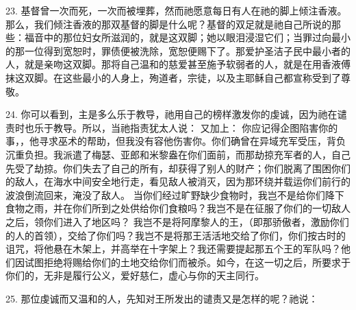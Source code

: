 23. 基督曾一次而死，一次而被埋葬，然而祂愿意每日有人在祂的脚上倾注香液。那么，我们倾注香液的那双基督的脚是什么呢？基督的双足就是祂自己所说的那些：福音中的那位妇女所滋润的，就是这双脚；她以眼泪浸湿它们；当罪过向最小的那一位得到宽恕时，罪债便被洗除，宽恕便赐下了。那爱护圣洁子民中最小者的人，就是亲吻这双脚。那将自己温和的慈爱甚至施予软弱者的人，就是在用香液傅抹这双脚。在这些最小的人身上，殉道者，宗徒，以及主耶稣自己都宣称受到了尊敬。\par

24. 你可以看到，主是多么乐于教导，祂用自己的榜样激发你的虔诚，因为祂在谴责时也乐于教导。所以，当祂指责犹太人说： 又加上： 你应记得企图陷害你的事，，他寻求巫术的帮助，但我没有容他伤害你。你们确曾在异域充军受压，背负沉重负担。我派遣了梅瑟、亚郎和米黎盎在你们面前，而那劫掠充军者的人，自己先受了劫掠。你们失去了自己的所有，却获得了别人的财产；你们脱离了围困你们的敌人，在海水中间安全地行走，看见敌人被消灭，因为那环绕并载运你们前行的波浪倒流回来，淹没了敌人。 当你们经过旷野缺少食物时，我岂不是给你们降下食物之雨，并在你们所到之处供给你们食粮吗？我岂不是在征服了你们的一切敌人之后，领你们进入了地区吗？ 我岂不是将阿摩黎人的王，（即那骄傲者，激励你们的人的首领），交给了你们吗？我岂不是将那王活活地交给了你们，你们按古时的诅咒，将他悬在木架上，并高举在十字架上？我还需要提起那五个王的军队吗？他们因试图拒绝将赐给你们的土地交给你们而被杀。如今，在这一切之后，所要求于你们的，无非是履行公义，爱好慈仁，虚心与你的天主同行。\par

25. 那位虔诚而又温和的人，先知对王所发出的谴责又是怎样的呢？祂说：\par

